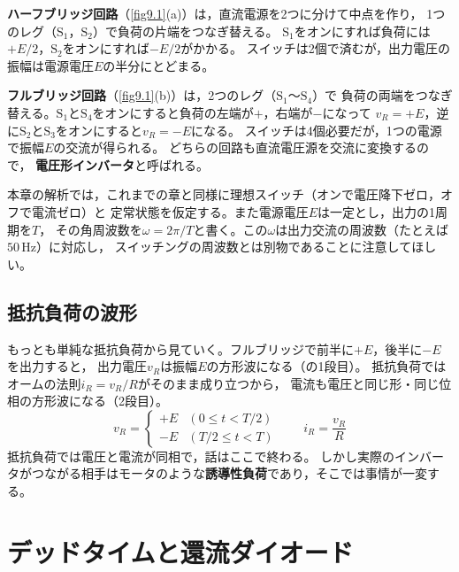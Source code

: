\textbf{ハーフブリッジ回路}（\ref{fig9.1}(a)）は，直流電源を2つに分けて中点を作り，
1つのレグ（$\mathrm{S}_1$，$\mathrm{S}_2$）で負荷の片端をつなぎ替える。
$\mathrm{S}_1$をオンにすれば負荷には$+E/2$，$\mathrm{S}_2$をオンにすれば$-E/2$がかかる。
スイッチは2個で済むが，出力電圧の振幅は電源電圧$E$の半分にとどまる。

\textbf{フルブリッジ回路}（\ref{fig9.1}(b)）は，2つのレグ（$\mathrm{S}_1$〜$\mathrm{S}_4$）で
負荷の両端をつなぎ替える。$\mathrm{S}_1$と$\mathrm{S}_4$をオンにすると負荷の左端が$+$，右端が$-$になって
$v_R = +E$，逆に$\mathrm{S}_2$と$\mathrm{S}_3$をオンにすると$v_R = -E$になる。
スイッチは4個必要だが，1つの電源で振幅$E$の交流が得られる。
どちらの回路も直流電圧源を交流に変換するので，
\textbf{電圧形インバータ}と呼ばれる。

\begin{注意}
本章の解析では，これまでの章と同様に理想スイッチ（オンで電圧降下ゼロ，オフで電流ゼロ）と
定常状態を仮定する。また電源電圧$E$は一定とし，出力の1周期を$T$，
その角周波数を$\omega = 2\pi/T$と書く。この$\omega$は出力交流の周波数（たとえば$50$\,Hz）に対応し，
スイッチングの周波数とは別物であることに注意してほしい。
\end{注意}

\subsection{抵抗負荷の波形}

もっとも単純な抵抗負荷から見ていく。フルブリッジで前半に$+E$，後半に$-E$を出力すると，
出力電圧$v_R$は振幅$E$の方形波になる（の1段目）。
抵抗負荷ではオームの法則$i_R = v_R/R$がそのまま成り立つから，
電流も電圧と同じ形・同じ位相の方形波になる（2段目）。
\begin{equation}
v_R =
\left\{
\begin{array}{ll}
+E & (0 \le t < T/2) \\
-E & (T/2 \le t < T)
\end{array}
\right.
\qquad
i_R = \frac{v_R}{R}
\label{eq9.1}
\end{equation}
抵抗負荷では電圧と電流が同相で，話はここで終わる。
しかし実際のインバータがつながる相手はモータのような\textbf{誘導性負荷}であり，そこでは事情が一変する。

\section{デッドタイムと還流ダイオード}
\label{sec9.2}

